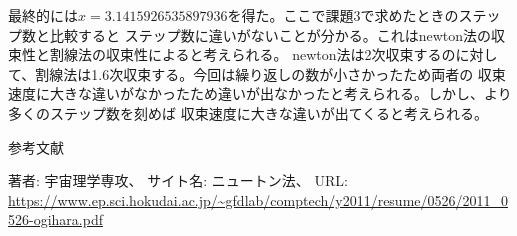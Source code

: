 \documentclass[uplatex,dvipdfmx,a4paper,10pt]{jsarticle}
\begin{document}
            最終的には$x = 3.1415926535897936$を得た。ここで課題3で求めたときのステップ数と比較すると
            ステップ数に違いがないことが分かる。これはnewton法の収束性と割線法の収束性によると考えられる。
            newton法は2次収束するのに対して、割線法は1.6次収束する。今回は繰り返しの数が小さかったため両者の
            収束速度に大きな違いがなかったため違いが出なかったと考えられる。しかし、より多くのステップ数を刻めば
            収束速度に大きな違いが出てくると考えられる。




    参考文献
    \begin{thebibliography}{99}
         著者: 宇宙理学専攻、 サイト名: ニュートン法、 URL: \url{https://www.ep.sci.hokudai.ac.jp/~gfdlab/comptech/y2011/resume/0526/2011_0526-ogihara.pdf}
    \end{thebibliography}
    
    
    \appendix
    \setcounter{figure}{0}
    \setcounter{table}{0}
    \renewcommand{\thetable}{\Alph{section}\arabic{table}}
    \renewcommand{\thefigure}{\Alph{section}\arabic{figure}}
    \makeatletter 
    \newcommand{\section@cntformat}{付録 \thesection:\ }
    \makeatother
    
    
\end{document}
